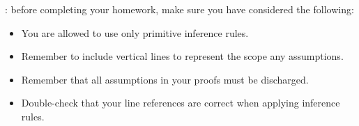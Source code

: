 \documentclass{article}
\begin{document}

: before completing your homework,  make sure you have considered the following:
\begin{itemize}
\item You are allowed to use only primitive inference rules.
\item Remember to include vertical lines to represent the scope any assumptions.
\item Remember that all assumptions in your proofs must be discharged.
\item Double-check that your line references are correct when applying inference rules.
\end{itemize}

\bigskip

\begin{enumerate}[\bf I.]


\end{enumerate}
\end{document}

